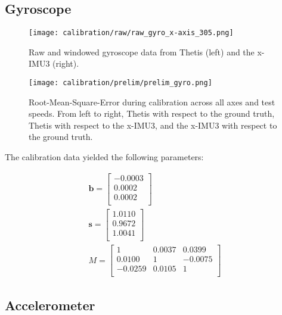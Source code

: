 \subsection{Gyroscope}

\begin{figure}
    \centering
    \texttt{[image: calibration/raw/raw\_gyro\_x-axis\_305.png]}
    \caption[Raw and Windowed Gyroscope Data]{Raw and windowed gyroscope data from Thetis (left) and the x-IMU3 (right).}
    \label{fig:raw_gyro_data}
\end{figure}

\begin{figure}
    \centering
    \texttt{[image: calibration/prelim/prelim\_gyro.png]}
    \caption[Cummulative Gyroscope Error]{Root-Mean-Square-Error during calibration across all axes and test speeds. From left to right, Thetis with respect to the ground truth, Thetis with respect to the x-IMU3, and the x-IMU3 with respect to the ground truth.}
    \label{fig:prelim_gyro_data}
\end{figure}

The calibration data yielded the following parameters:

\begin{gather}
    \pmb{b} = \begin{bmatrix} \label{eq:accelerometer_bias}
        -0.0003 \\
        0.0002 \\
        0.0002 \\
    \end{bmatrix} \\
    \pmb{s} = \begin{bmatrix} \label{eq:accelerometer_sensitivity}
        1.0110 \\
        0.9672 \\
        1.0041 \\
    \end{bmatrix} \\
    M = \begin{bmatrix} \label{eq:accelerometer_misalignment}
        1 & 0.0037 & 0.0399 \\
        0.0100 & 1 & -0.0075 \\
        -0.0259 & 0.0105 & 1 \\
    \end{bmatrix}
\end{gather}

\subsection{Accelerometer}

